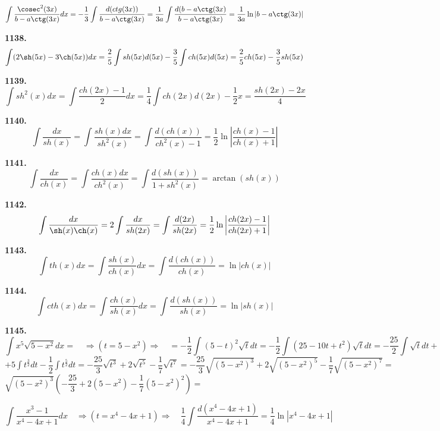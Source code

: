 \documentclass[12pt]{article}
\begin{document}
	 \[
		\int \dfrac{\cosec^2(3x)}{b-a\ctg(3x)}dx = -\dfrac{1}{3}\int \dfrac{d(ctg(3x))}{b-a\ctg(3x)} = \dfrac{1}{3a}\int \dfrac{d(b-a\ctg(3x)}{b-a\ctg(3x)}  = \dfrac{1}{3a}\ln|b-a\ctg(3x)|
	\]
	
	{\bf 1138.} \[
		\int (2\sh(5x) - 3\ch(5x))dx = \dfrac{2}{5}\int sh(5x)d(5x) - \dfrac{3}{5}\int ch(5x)d(5x) = \dfrac{2}{5}ch(5x) - \dfrac{3}{5}sh(5x)
	\]
	
	{\bf 1139.} \[
		\int sh^2 (x) dx = \int \dfrac{ch(2x)-1}{2}dx = \dfrac{1}{4}\int ch(2x)d(2x) - \dfrac{1}{2}x = \dfrac{sh(2x) - 2x}{4}
	\]
	
	{\bf 1140.} \[
		\int \dfrac{dx}{sh(x)} = \int \dfrac{sh(x)dx}{sh^2(x)} = \int\dfrac{d(ch(x))}{ch^2(x)-1} = \dfrac{1}{2}\ln\left|\dfrac{ch(x)-1}{ch(x)+1}\right|
	\]
	
	
	{\bf 1141.} \[
		\int \dfrac{dx}{ch(x)} = \int \dfrac{ch(x)dx}{ch^2(x)} = \int \dfrac{d(sh(x))}{1+sh^2(x)} = \arctan(sh(x))
	\]
	
	
	{\bf 1142.} \[
		\int \dfrac{dx}{\sh(x)\ch(x)} = 2\int \dfrac{dx}{sh(2x)} = \int \dfrac{d(2x)}{sh(2x)} = \dfrac{1}{2}\ln\left|\dfrac{ch(2x)-1}{ch(2x)+1}\right|
	\]
	
	{\bf 1143.} \[
		\int th(x)dx = \int \dfrac{sh(x)}{ch(x)}dx = \int \dfrac{d(ch(x))}{ch(x)} = \ln|ch(x)|
	\]
	
	{\bf 1144.} \[
		\int cth(x)dx = \int \dfrac{ch(x)}{sh(x)}dx = \int \dfrac{d(sh(x))}{sh(x)} = \ln|sh(x)|
	\]
	
	\bigskip
	
	{\bf 1145.}\[
		\int x^5\sqrt{5-x^2}dx =\quad \Longrightarrow(t = 5-x^2)  \Longrightarrow\quad = -\dfrac{1}{2}\int (5-t)^2\sqrt{t}dt = -\dfrac{1}{2}\int (25-10t+t^2)\sqrt{t}dt = -\dfrac{25}{2}\int \sqrt{t}dt + 
	\]
	$
	\displaystyle+5\int t^{\frac{3}{2}}dt - \dfrac{1}{2}\int t^\frac{5}{2}dt = -\dfrac{25}{3}\sqrt{t^3} + 2\sqrt{t^5} - \dfrac{1}{7} \sqrt{t^7} = -\dfrac{25}{3}\sqrt{(5-x^2)^3}+2\sqrt{(5-x^2)^5} - \dfrac{1}{7}\sqrt{(5-x^2)^7} = 
	$\vspace{2mm}
	$
	\sqrt{(5-x^2)^3}\left(-\dfrac{25}{3} + 2(5-x^2)-\dfrac{1}{7}(5-x^2)^2\right) = 
	$
	
	
	 \[
		\int \dfrac{x^3-1}{x^4-4x+1}dx\quad \Longrightarrow(t = x^4-4x+1)  \Longrightarrow\quad \dfrac{1}{4}\int \dfrac{d(x^4-4x+1)}{x^4-4x+1} = \dfrac{1}{4}\ln|x^4-4x+1|
	\]
	
	
	
	
	
\end{document}
